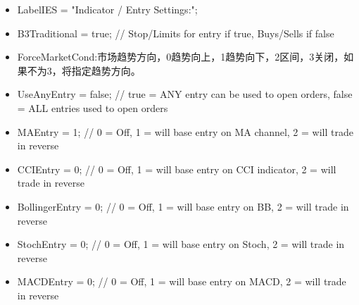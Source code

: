 \begin{itemize}
\item LabelIES            = "Indicator / Entry Settings:";
\item B3Traditional       = true;     // Stop/Limits for entry if true, Buys/Sells if false
\item ForceMarketCond:市场趋势方向，0趋势向上，1趋势向下，2区间，3关闭，如果不为3，将指定趋势方向。
\item UseAnyEntry         = false;    // true = ANY entry can be used to open orders, false = ALL entries used to open orders
\item MAEntry             = 1;        // 0 = Off, 1 = will base entry on MA channel, 2 = will trade in reverse
\item CCIEntry            = 0;        // 0 = Off, 1 = will base entry on CCI indicator, 2 = will trade in reverse
\item BollingerEntry      = 0;        // 0 = Off, 1 = will base entry on BB, 2 = will trade in reverse
\item StochEntry          = 0;        // 0 = Off, 1 = will base entry on Stoch, 2 = will trade in reverse
\item MACDEntry           = 0;        // 0 = Off, 1 = will base entry on MACD, 2 = will trade in reverse


\end{itemize}
